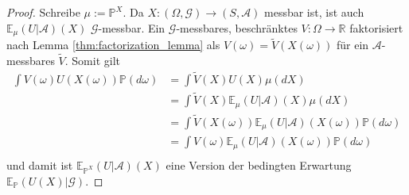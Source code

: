 \begin{proof}
Schreibe $\mu := \mathbb{P}^X$. Da $X: (\Omega, \mathcal{G}) \rightarrow (S, \mathcal{A})$ messbar ist, ist auch $\mathbb{E}_\mu(U\vert \mathcal{A})(X)$ $\mathcal{G}$-messbar. Ein $\mathcal{G}$-messbares, beschränktes $V:\Omega \rightarrow \mathbb{R}$ faktorisiert nach Lemma \ref{thm:factorization_lemma} als $V(\omega) = \tilde{V}(X(\omega))$ für ein $\mathcal{A}$-messbares $\tilde{V}$. Somit gilt
\begin{align*}
\int V(\omega)U(X(\omega))\mathbb{P}(d\omega) &= \int \tilde{V}(X)U(X) \mu(dX)  \\
&= \int \tilde{V}(X)\mathbb{E}_\mu(U \vert \mathcal{A})(X) \mu(dX) \\
&= \int \tilde{V}(X(\omega)) \mathbb{E}_\mu(U \vert \mathcal{A})(X(\omega)) \mathbb{P}(d\omega) \\
&= \int V(\omega) \mathbb{E}_\mu(U \vert \mathcal{A})(X(\omega)) \mathbb{P}(d\omega) \\
\end{align*}
und damit ist $\mathbb{E}_{\mathbb{P}^{X}}(U \vert \mathcal{A})(X)$ eine Version der bedingten Erwartung $\mathbb{E}_{\mathbb{P}}(U(X) \vert \mathcal{G})$.
\end{proof}

